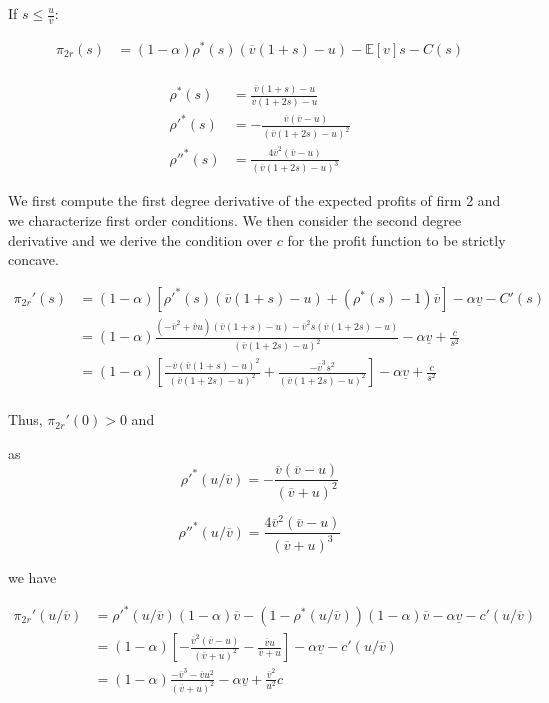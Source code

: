 \documentclass[a4paper,leqno]{article}%
\newcommand{\E}{\mathbb E}
\renewcommand{\a}{\alpha}
\newcommand{\uv}{\underline{v}}
\newcommand{\ov}{\overline{v}}
\begin{document}
If $s\leq\frac{u}{\ov}$:

\begin{equation}
    \begin{aligned}
\pi_{2r}(s)&=(1-\a)\rho^*(s)(\ov(1+s)-u)-\E[v]s-C(s)\\
\end{aligned}
\end{equation}

\begin{equation}
    \begin{aligned}
\rho^*(s)&=\frac{\ov(1+s)-u}{\ov(1+2s)-u}\\
\rho'^{*}(s)&=-\frac{\ov(\ov-u)}{(\ov(1+2s)-u)^2}\\
\rho''^{*}(s)&=\frac{4\ov^2(\ov-u)}{(\ov(1+2s)-u)^3}
    \end{aligned}
\end{equation}

We first compute the first degree derivative of the expected profits of firm 2 and we characterize first order conditions. We then consider the second degree derivative and we derive the condition over $c$ for the profit function to be strictly concave.

\begin{equation}
    \begin{aligned}
\pi_{2r}'(s)&=(1-\a)[\rho'^*(s)(\ov(1+s)-u)+(\rho^*(s)-1)\ov]-\a \uv-C'(s)\\
            &=(1-\a)\frac{(-\ov^2+\ov u)(\ov(1+s)-u)-\ov^2s(\ov(1+2s)-u)}{(\ov(1+2s)-u)^2}-\a \uv+\frac{c}{s^2}\\
            &=(1-\a)\left[\frac{-\ov(\ov(1+s)-u)^2}{(\ov(1+2s)-u)^2}+\frac{-\ov^3s^2}{(\ov(1+2s)-u)^2}\right]-\a \uv+\frac{c}{s^2}\\
\end{aligned}
\end{equation}

Thus, $\pi_{2r}'(0)>0$ and 

as $$\rho'^{*}(u/\ov)=-\frac{\ov(\ov-u)}{(\ov+u)^2}$$

$$\rho''^{*}(u/\ov)=\frac{4\ov^2(\ov-u)}{(\ov+u)^3}$$

we have

\begin{equation}
    \begin{aligned}
\pi_{2r}'(u/\ov)&=\rho'^*(u/\ov)(1-\a)\ov-(1-\rho^*(u/\ov))(1-\a)\ov-\a\uv-c'(u/\ov)\\
                &=(1-\a)\left[-\frac{\ov^2(\ov-u)}{(\ov+u)^2}-\frac{\ov u}{\ov+u}\right]-\a \uv-c'(u/\ov)\\
                &= (1-\a)\frac{-\ov^3-\ov u^2}{(\ov+u)^2}-\a \uv+\frac{\ov^2}{u^2}c
    \end{aligned}
\end{equation}
\end{document}
